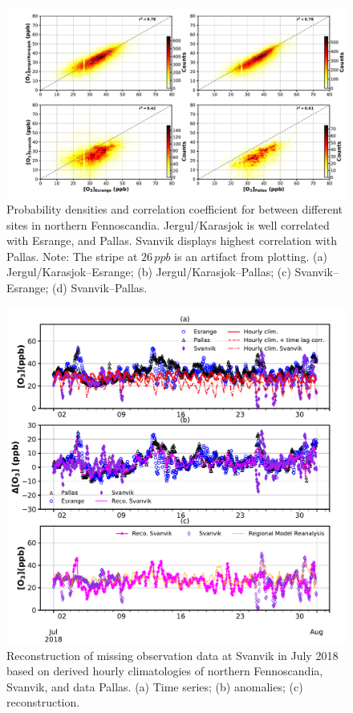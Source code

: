 \documentclass[bg, manuscript]{copernicus}
\begin{document}
\begin{figure}[t]
  \includegraphics[width=12cm]{figA2}
  \caption{Probability densities and correlation coefficient for \chem{[O_3]} between different sites in northern Fennoscandia. Jergul/Karasjok is well correlated with Esrange, and Pallas. Svanvik displays highest correlation with Pallas. Note: The stripe at $26\,\unit{ppb}$ is an artifact from plotting. (a) Jergul/Karasjok--Esrange; (b) Jergul/Karasjok--Pallas; (c) Svanvik--Esrange; (d) Svanvik--Pallas.}
  \label{fig:density_distribution}
\end{figure}

\begin{figure}[t]
  \includegraphics[width=12cm]{figA3}
  \caption{Reconstruction of missing \chem{[O_3]} observation data at Svanvik in July 2018 based on derived hourly climatologies of northern Fennoscandia, Svanvik, and data Pallas. (a) Time series; (b) anomalies; (c) reconstruction.}
  \label{fig:ozone_reconstruction_2018_07}
\end{figure}
\end{document}
